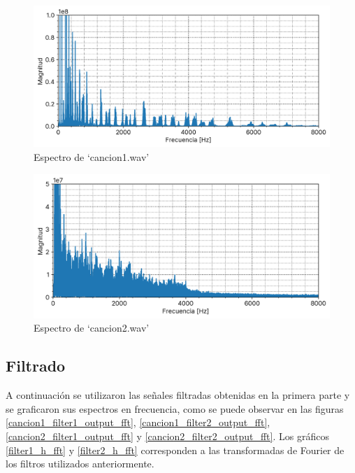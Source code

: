 \documentclass[12pt]{article}
\begin{document}
\begin{figure}[H]
\centering
\includegraphics{plot/cancion1_fft.png}
\caption{Espectro de `cancion1.wav'}
\label{cancion1_fft}
\end{figure}

\begin{figure}[H]
\centering
\includegraphics{plot/cancion2_fft.png}
\caption{Espectro de `cancion2.wav'}
\label{cancion2_fft}
\end{figure}

\hypertarget{filtrado}{%
\subsection{Filtrado}\label{filtrado}}

A continuación se utilizaron las señales filtradas obtenidas en la primera parte y se graficaron sus espectros en frecuencia, como se puede observar en las figuras \ref{cancion1_filter1_output_fft}, \ref{cancion1_filter2_output_fft}, \ref{cancion2_filter1_output_fft} y \ref{cancion2_filter2_output_fft}. Los gráficos \ref{filter1_h_fft} y \ref{filter2_h_fft} corresponden a las transformadas de Fourier de los filtros utilizados anteriormente.
\end{document}
